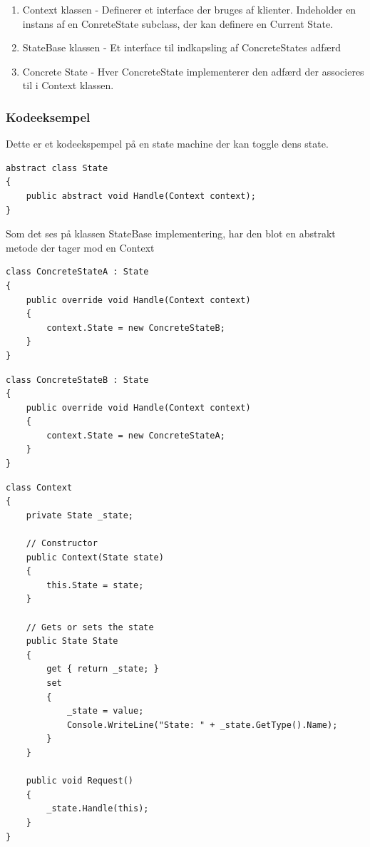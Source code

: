 \begin{enumerate}
	\item Context klassen - Definerer et interface der bruges af klienter. Indeholder en instans af en ConreteState subclass, der kan definere en Current State.
	\item StateBase klassen - Et interface til indkapsling af ConcreteStates adfærd
	\item Concrete State - Hver ConcreteState implementerer den adfærd der associeres til i Context klassen.
\end{enumerate}

\subsubsection{Kodeeksempel}

Dette er et kodeekspempel på en state machine der kan toggle dens state.

\begin{lstlisting}[caption=StateBase klassen,
morekeywords={abstract, Context}]
abstract class State
{
	public abstract void Handle(Context context);
}
\end{lstlisting}

Som det ses på klassen StateBase implementering, har den blot en abstrakt metode der tager mod en Context

\begin{lstlisting}[caption=ConcreteStateA klassen - Switcher til State B,
morekeywords={abstract, Context}]
class ConcreteStateA : State
{
	public override void Handle(Context context)
	{
		context.State = new ConcreteStateB;
	}
}
\end{lstlisting}

\begin{lstlisting}[caption=StateBase klassen - Switcher til state A,
morekeywords={abstract, Context}]
class ConcreteStateB : State
{
	public override void Handle(Context context)
	{
		context.State = new ConcreteStateA;
	}
}
\end{lstlisting}


\begin{minipage}{\linewidth}
\begin{lstlisting}[caption=Context klassen - Bruges i main() til at kalde Request(),
morekeywords={abstract, Context}]
class Context
{
	private State _state;
	
	// Constructor
	public Context(State state)
	{
		this.State = state;
	}
	
	// Gets or sets the state
	public State State
	{
		get { return _state; }
		set
		{
			_state = value;
			Console.WriteLine("State: " + _state.GetType().Name);
		}
	}
	
	public void Request()
	{
		_state.Handle(this);
	}
}
\end{lstlisting}
\end{minipage}

